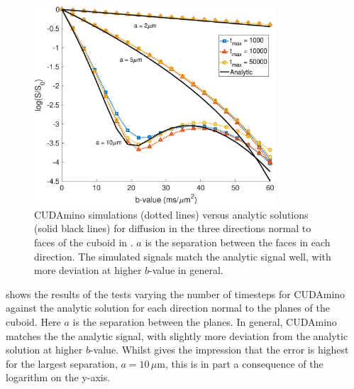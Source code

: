 \begin{figure}
  \centering
  \includegraphics[width=0.8\textwidth]{figures/cudamino/new/cuboid_all_cudamino_tmax.eps}
  \caption[CUDAmino simulations versus analytic solutions for varying $t_{max}$.]{CUDAmino simulations (dotted lines) versus analytic solutions (solid black lines) for diffusion in the three directions normal to faces of the cuboid in . $a$ is the separation between the faces in each direction. The simulated signals match the analytic signal well, with more deviation at higher $b$-value in general. }
  \label{fig:cuboid_cudamino_tmax}
\end{figure}


 shows the results of the tests varying the number of timesteps for CUDAmino against the analytic solution for each direction normal to the planes of the cuboid. Here $a$ is the separation between the planes. In general, CUDAmino matches the the analytic signal, with slightly more deviation from the analytic solution at higher $b$-value.
Whilst  gives the impression that the error is highest for the largest separation, $a=10\,\mu$m, this is in part a consequence of the logarithm on the y-axis.

